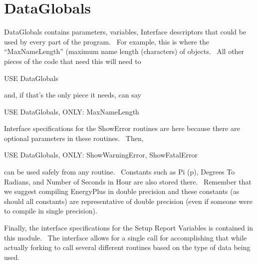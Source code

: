 \section{DataGlobals}\label{dataglobals}

DataGlobals contains parameters, variables, Interface descriptors that could be used by every part of the program.~ For example, this is where the ``MaxNameLength'' (maximum name length (characters) of objects.~ All other pieces of the code that need this will need to

USE DataGlobals

and, if that's the only piece it needs, can say

USE DataGlobals, ONLY: MaxNameLength

Interface specifications for the ShowError routines are here because there are optional parameters in these routines.~ Then,

USE DataGlobals, ONLY: ShowWarningError, ShowFatalError

can be used safely from any routine.~ Constants such as Pi (p), Degrees To Radians, and Number of Seconds in Hour are also stored there.~ Remember that we suggest compiling EnergyPlus in double precision and these constants (as should all constants) are representative of double precision (even if someone were to compile in single precision).

Finally, the interface specifications for the Setup Report Variables is contained in this module.~ The interface allows for a single call for accomplishing that while actually forking to call several different routines based on the type of data being used.
